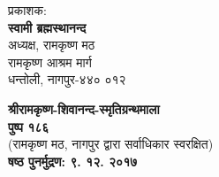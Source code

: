 \thispagestyle{empty}

\begin{flushleft}
\end{flushleft}

\vfill

\begin{flushleft}
 प्रकाशक:\\\textbf{स्वामी ब्रह्मस्थानन्द}\\
 अध्यक्ष, रामकृष्ण मठ\\
 रामकृष्ण आश्रम मार्ग\\
 धन्तोली, नागपुर-४४० ०१२\\
\end{flushleft}

\vfill

\begin{flushleft}
 \textbf{श्रीरामकृष्ण-शिवानन्द-स्मृतिग्रन्थमाला\\पुष्प १८६ }\\
 (रामकृष्ण मठ, नागपुर द्वारा सर्वाधिकार स्वरक्षित)\\\textbf{षष्ठ पुनर्मुद्रण: ९. १२. २०१७}
\end{flushleft}

